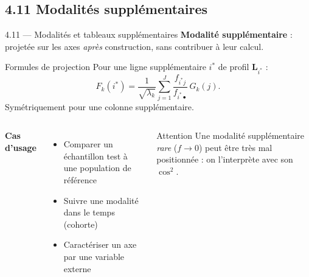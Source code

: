 \subsection{4.11 Modalités supplémentaires}
\begin{frame}{4.11 — Modalités et tableaux supplémentaires}
\textbf{Modalité supplémentaire} : projetée sur les axes \emph{après} construction,
sans contribuer à leur calcul.

\begin{block}{Formules de projection}
Pour une ligne supplémentaire $i^*$ de profil $\mathbf{L}_{i^*}$ :
\[
F_k(i^*) = \frac{1}{\sqrt{\lambda_k}}
         \sum_{j=1}^J \frac{f_{i^*j}}{f_{i^*\bullet}}\, G_k(j).
\]
Symétriquement pour une colonne supplémentaire.
\end{block}

\begin{columns}[T]
\textbf{Cas d'usage}
\begin{itemize}\small
  \item Comparer un échantillon test à une population de référence
  \item Suivre une modalité dans le temps (cohorte)
  \item Caractériser un axe par une variable externe
\end{itemize}
\begin{alertblock}{Attention}
\small Une modalité supplémentaire \emph{rare} ($f \to 0$) peut être très
mal positionnée : on l'interprète avec son $\cos^2$.
\end{alertblock}
\end{columns}
\end{frame}

